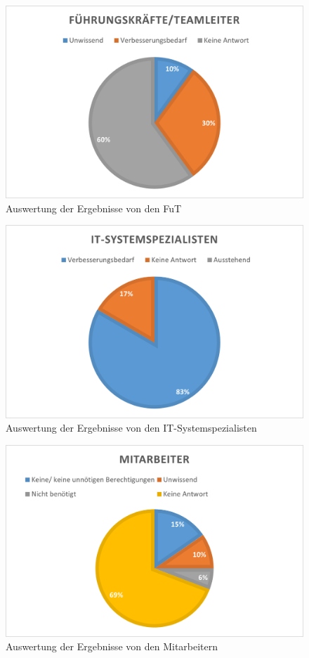 \begin{figure}[h!]
 \centering
 \includegraphics[width=1\textwidth]{gfx/Picture/FuT.PNG}
 \caption{Auswertung der Ergebnisse von den \ac{FuT}}
 \label{fig:Fut}
\end{figure}
\begin{figure}[h!]
 \centering
 \includegraphics[width=1\textwidth]{gfx/Picture/IT.PNG}
 \caption{Auswertung der Ergebnisse von den IT-Systemspezialisten}
 \label{fig:IT}
\end{figure}
\begin{figure}[h!]
 \centering
 \includegraphics[width=1\textwidth]{gfx/Picture/Mitarbeiter.PNG}
 \caption{Auswertung der Ergebnisse von den Mitarbeitern}
 \label{fig:Mit}
\end{figure}
